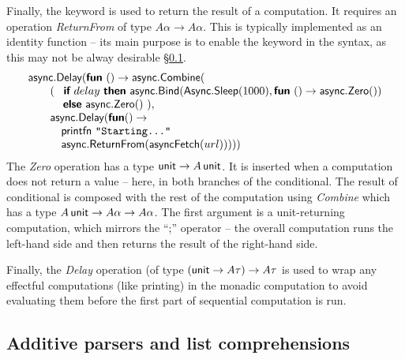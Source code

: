 \documentclass[runningheads,a4paper]{llncs}
\begin{document}
Finally, the  keyword is used to return the result of a computation. 
It requires an operation \emph{ReturnFrom} of type $A\alpha \rightarrow A\alpha$. This is typically
implemented as an identity function -- its main purpose is to enable the  keyword in 
the syntax, as this may not be alway desirable \S\ref{sec:intro-seq-parsers}.
%
\begin{equation*}
\begin{array}{l}
\textnormal{\sffamily async}.\textnormal{\sffamily Delay}(\textnormal{\bfseries\sffamily fun}~() \rightarrow \textnormal{\sffamily async}.\textnormal{\sffamily Combine}( \\
\quad\quad (~~\,\textnormal{\bfseries\sffamily if}~delay~\textnormal{\bfseries\sffamily then}~
   \textnormal{\sffamily async}.\textnormal{\sffamily Bind}(\textnormal{\sffamily Async}.\textnormal{\sffamily Sleep}(1000), \textnormal{\bfseries\sffamily fun}~() \rightarrow \textnormal{\sffamily async}.\textnormal{\sffamily Zero}())\\
\quad\quad ~~~\,\textnormal{\bfseries\sffamily else}~\textnormal{\sffamily async}.\textnormal{\sffamily Zero}()~),\\
\quad\quad \textnormal{\sffamily async}.\textnormal{\sffamily Delay}(\textnormal{\bfseries\sffamily fun} () \rightarrow\\
\quad\quad\quad \textnormal{\sffamily printfn}~\texttt{"Starting..."}\\
\quad\quad\quad \textnormal{\sffamily async}.\textnormal{\sffamily ReturnFrom}(\textnormal{\sffamily asyncFetch}(url))) ))
\end{array}
\end{equation*}
%
The \emph{Zero} operation has a type $\textnormal{\sffamily unit} \rightarrow A\,\textnormal{\sffamily unit}$. It is inserted
when a computation does not return a value -- here, in both branches of the conditional. The
result of conditional is composed with the rest of the computation using \emph{Combine} which has
a type $A\,\textnormal{\sffamily unit} \rightarrow A\alpha \rightarrow A\alpha$. The first argument is a unit-returning
computation, which mirrors the ``;'' operator -- the overall computation runs the left-hand side and
then returns the result of the right-hand side.

Finally, the \emph{Delay} operation (of type $(\textnormal{\sffamily unit} \rightarrow A\tau) \rightarrow A\tau$ is
used to wrap any effectful computations (like printing) in the monadic computation to avoid evaluating
them before the first part of sequential computation is run.


\subsection{Additive parsers and list comprehensions}
\label{sec:intro-seq-parsers}
\end{document}
